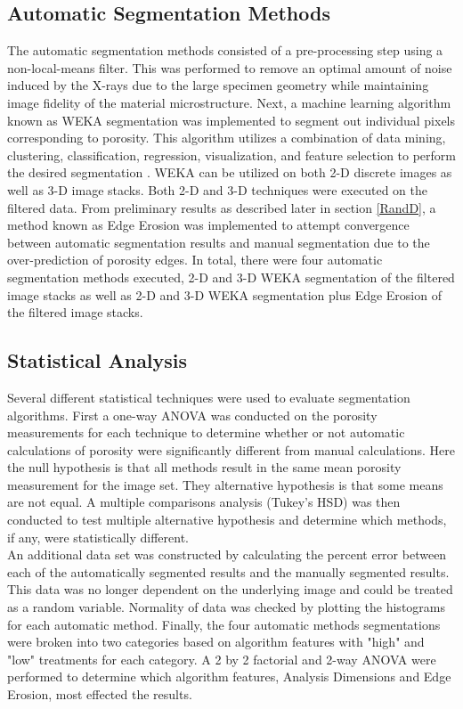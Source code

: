 \documentclass[11pt, twocolumn]{article}
\begin{document}
\subsection{Automatic Segmentation Methods}
The automatic segmentation methods consisted of a pre-processing step using a non-local-means filter. This was performed to remove an optimal amount of noise induced by the X-rays due to the large specimen geometry while maintaining image fidelity of the material microstructure. Next, a machine learning algorithm known as WEKA segmentation was implemented to segment out individual pixels corresponding to porosity. This algorithm utilizes a combination of data mining, clustering, classification, regression, visualization, and feature selection to perform the desired segmentation \cite{Cunningham1993,Holmes1993,Holmes1993_2,Witten1993}. WEKA can be utilized on both 2-D discrete images as well as 3-D image stacks. Both 2-D and 3-D techniques were executed on the filtered data. From preliminary results as described later in section \ref{RandD}, a method known as Edge Erosion was implemented to attempt convergence between automatic segmentation results and manual segmentation due to the over-prediction of porosity edges. In total, there were four automatic segmentation methods executed, 2-D and 3-D WEKA segmentation of the filtered image stacks as well as 2-D and 3-D WEKA segmentation plus Edge Erosion of the filtered image stacks.

\subsection{Statistical Analysis} 
Several different statistical techniques were used to evaluate segmentation algorithms. First a one-way ANOVA was conducted on the porosity measurements for each technique to determine whether or not automatic calculations of porosity were significantly different from manual calculations. Here the null hypothesis is that all methods result in the same mean porosity measurement for the image set. They alternative hypothesis is that some means are not equal. A multiple comparisons analysis (Tukey's HSD) was then conducted to test multiple alternative hypothesis and determine which methods, if any, were statistically different.\\

An additional data set was constructed by calculating the percent error between each of the automatically segmented results and the manually segmented results. This data was no longer dependent on the underlying image and could be treated as a random variable. Normality of data was checked by plotting the histograms for each automatic method. Finally, the four automatic methods segmentations were broken into two categories based on algorithm features with "high" and "low" treatments for each category. A 2 by 2 factorial and 2-way ANOVA were performed to determine which algorithm features, Analysis Dimensions and Edge Erosion, most effected the results. 
\end{document}
